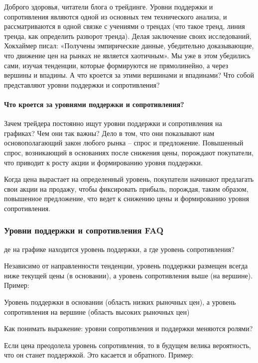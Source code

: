 \documentclass{book}
\begin{document}
Доброго здоровья, читатели блога о трейдинге. Уровни поддержки и
сопротивления являются одной из основных тем технического анализа, и
рассматриваются в одной связке с учениями о трендах (что такое тренд,
линия тренда, как определить разворот тренда). Делая заключение своих
исследований, Хокхаймер писал: «Получены эмпирические данные,
убедительно доказывающие, что движение цен на рынках не является
хаотичным». Мы уже в этом убедились сами, изучая тенденции, которые
формируются не прямолинейно, а через вершины и впадины. А что кроется
за этими вершинами и впадинами? Что собой представляют уровни
поддержки и сопротивления?

\paragraph{Что кроется за уровнями поддержки и сопротивления?  }

Зачем трейдера постоянно ищут уровни поддержки и сопротивления на графиках? Чем они так важны?  Дело в том, что они показывают нам основополагающий закон любого рынка – спрос и предложение. Повышенный спрос, возникающий в основаниях после снижения цены, порождают покупатели, что приводит к росту акции и формированию уровня поддержки.

Когда цена вырастает на определенный уровень, покупатели начинают
предлагать свои акции на продажу, чтобы фиксировать прибыль,
порождая, таким образом, повышенное предложение, что ведет к снижению
цены и формированию уровня сопротивления.

\subsubsection{Уровни поддержки и сопротивления FAQ}


де на графике находится уровень поддержки, а где уровень сопротивления?

Независимо от направленности тенденции, уровень поддержки размещен всегда ниже текущей цены (в основании), а уровень сопротивления выше (на вершине). Пример:

Уровень поддержки в основании (область низких рыночных цен), а уровень сопротивления на вершине (область высоких рыночных цен)

Как понимать выражение: уровни сопротивления и поддержки меняются ролями?

Если цена преодолела уровень сопротивления, то в будущем велика вероятность, что он станет поддержкой. Это касается и обратного. Пример:
\end{document}
